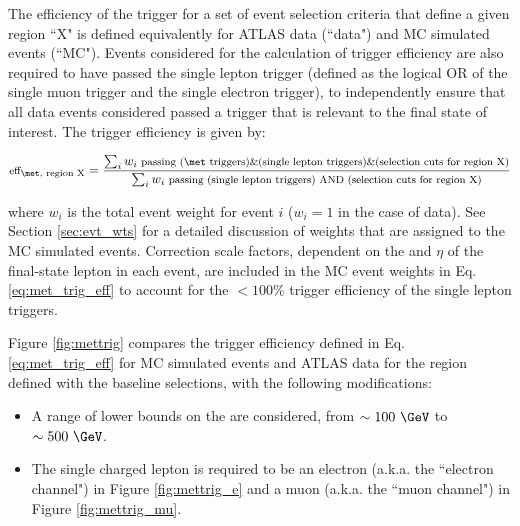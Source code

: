 The efficiency of the \met trigger for a set of event selection criteria that define a given region ``X" is defined equivalently for ATLAS data (``data") and MC simulated events (``MC"). Events considered for the calculation of trigger efficiency are also required to have passed the single lepton trigger (defined as the logical OR of the single muon trigger and the single electron trigger), to independently ensure that all data events considered passed a trigger that is relevant to the final state of interest. The trigger efficiency is given by:

\begin{equation}
\label{eq:met_trig_eff}
\begin{footnotesize}
\text{eff}_\text{\met, region X} = \frac{\sum_i w_i\text{ passing (\met triggers)\&(single lepton triggers)\&(selection cuts for region X)}}{\sum_i w_i\text{ passing (single lepton triggers)\text{ AND }(selection cuts for region X)}}
\end{footnotesize}
\end{equation}

\noindent where $w_i$ is the total event weight for event \(i\) ($w_i=1$ in the case of data). See Section \ref{sec:evt_wts} for a detailed discussion of weights that are assigned to the MC simulated events. Correction scale factors, dependent on the \pt and \(\eta\) of the final-state lepton in each event, are included in the MC event weights in Eq. \ref{eq:met_trig_eff} to account for the \(<100\%\) trigger efficiency of the single lepton triggers. 

Figure \ref{fig:mettrig} compares the \met trigger efficiency defined in Eq. \ref{eq:met_trig_eff} for MC simulated events and ATLAS data for the region defined with the baseline selections, with the following modifications:

\begin{itemize}
\item A range of lower bounds on the \met are considered, from \(\sim100~\GeV\) to \(\sim500~\GeV\).
\item The single charged lepton is required to be an electron (a.k.a. the ``electron channel") in Figure \ref{fig:mettrig_e} and a muon (a.k.a. the ``muon channel") in Figure \ref{fig:mettrig_mu}.
\end{itemize}

